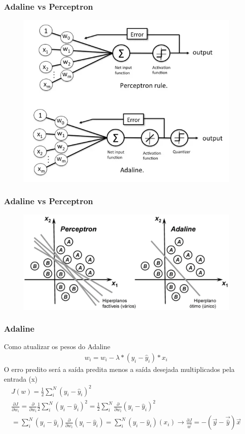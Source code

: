 \documentclass{beamer}
\begin{document}
\begin{frame}
	\frametitle{Adaline vs Perceptron}
	\begin{figure}
		\centering
		\includegraphics[width=0.7\linewidth]{figures/comparacao_perceptron_adaline}
	\end{figure}
\end{frame}
\begin{frame}
	\frametitle{Adaline vs Perceptron}
	\begin{figure}
		\centering
		\includegraphics[width=0.9\linewidth]{figures/hiperplanos_perceptron_adaline}
	\end{figure}

\end{frame}
\begin{frame}
	\frametitle{Adaline}
	\begin{block}{Como atualizar os pesos do Adaline}
			\begin{gather*}
			w_i = w_i - \lambda * (y_i - \hat{y}_i) * x_i
		\end{gather*}
	O erro predito será a saída predita menos a saída desejada multiplicados pela entrada (x)
		\begin{gather*}
			J(w) = \frac{1}{2} \sum_{i}^{N} (y_i - \hat{y}_i)^2 \\ 
			\frac{\partial J}{\partial w_i} = \frac{\partial}{\partial w_i} \frac{1}{2} \sum_{i}^{N} (y_i - \hat{y}_i)^2 = \frac{1}{2} \sum_{i}^{N}\frac{\partial}{\partial w_i} (y_i - \hat{y}_i)^2  \\
			= \sum_{i}^{N}(y_i - \hat{y}_i)\frac{\partial}{\partial w_i} (y_i - \hat{y}_i) = \sum_{i}^{N}(y_i - \hat{y}_i) (x_i) \to \frac{\partial J}{\vec{w}} = - (\vec{y}- \vec{\hat{y}})\vec{x}
		\end{gather*}
	\end{block}

		
\end{frame}
\end{document}
